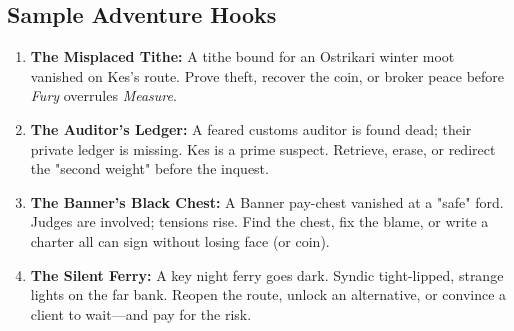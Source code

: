 \subsection*{Sample Adventure Hooks}

\begin{enumerate}
    \item \textbf{The Misplaced Tithe:} A tithe bound for an Ostrikari winter moot vanished on Kes's route. Prove theft, recover the coin, or broker peace before \emph{Fury} overrules \emph{Measure}.
    \item \textbf{The Auditor's Ledger:} A feared customs auditor is found dead; their private ledger is missing. Kes is a prime suspect. Retrieve, erase, or redirect the "second weight" before the inquest.
    \item \textbf{The Banner's Black Chest:} A Banner pay-chest vanished at a "safe" ford. Judges are involved; tensions rise. Find the chest, fix the blame, or write a charter all can sign without losing face (or coin).
    \item \textbf{The Silent Ferry:} A key night ferry goes dark. Syndic tight-lipped, strange lights on the far bank. Reopen the route, unlock an alternative, or convince a client to wait---and pay for the risk.
\end{enumerate}


